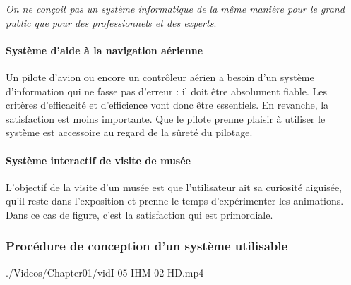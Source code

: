 \emph{On ne conçoit pas un système informatique de la même manière pour le grand public que pour des professionnels et des experts}.

\paragraph*{Système d'aide à la navigation aérienne}
Un pilote d'avion ou encore un contrôleur aérien a besoin d'un système d'information qui ne fasse pas d'erreur : il doit être absolument fiable. Les critères d'efficacité et d'efficience vont donc être essentiels. En revanche, la satisfaction est moins importante. Que le pilote prenne plaisir à utiliser le système est accessoire au regard de la sûreté du pilotage. 

\paragraph*{Système interactif de visite de musée}
L'objectif de la visite d'un musée est que l'utilisateur ait sa curiosité aiguisée, qu'il reste dans l'exposition et prenne le temps d'expérimenter les animations. Dans ce cas de figure, c'est la satisfaction qui est primordiale. 


\subsubsection[Procédure de conception]{Procédure de conception d'un système utilisable}
\label{subsub:I.3.1.3}

\begin{marginvideo}
		{./Videos/Chapter01/vidI-05-IHM-02-HD.mp4}%
\end{marginvideo}

